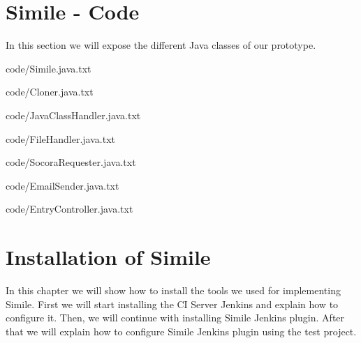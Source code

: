 \chapter{Simile - Code}
\label{append:simile-code}
In this section we will expose the different Java classes of our prototype.


{code/Simile.java.txt}


{code/Cloner.java.txt}


{code/JavaClassHandler.java.txt}


{code/FileHandler.java.txt}


{code/SocoraRequester.java.txt}


{code/EmailSender.java.txt}


{code/EntryController.java.txt}

\chapter{Installation of Simile}
In this chapter we will show how to install the tools we used for implementing Simile. First we will start installing the CI Server Jenkins and explain how to configure it. Then, we will continue with installing Simile Jenkins plugin. After that we will explain how to configure Simile Jenkins plugin using the test project.

